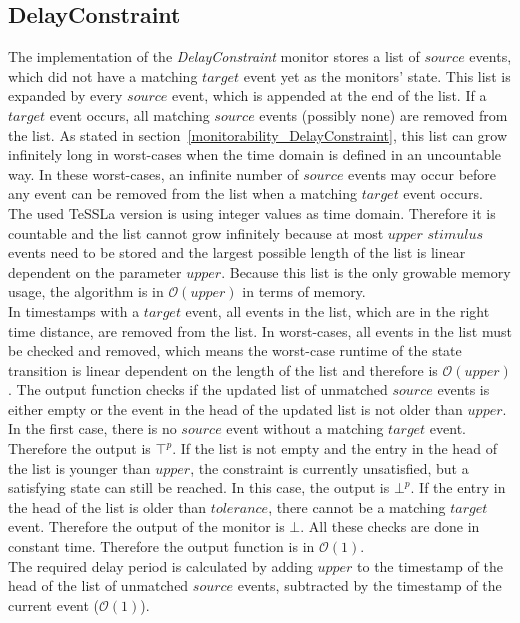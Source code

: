 \subsection{DelayConstraint}
	The implementation of the \emph{DelayConstraint} monitor stores a list of $source$ events, which did not have a matching $target$ event yet as the monitors' state. This list is expanded by every $source$ event, which is appended at the end of the list. If a $target$ event occurs, all matching $source$ events (possibly none) are removed from the list. As stated in section~\ref{monitorability_DelayConstraint}, this list can grow infinitely long in worst-cases when the time domain is defined in an uncountable way. In these worst-cases, an infinite number of $source$ events may occur before any event can be removed from the list when a matching $target$ event occurs.\\
	The used TeSSLa version is using integer values as time domain. Therefore it is countable and the list cannot grow infinitely because at most $upper$ $stimulus$ events need to be stored and the largest possible length of the list is linear dependent on the parameter $upper$. Because this list is the only growable memory usage, the algorithm is in $\mathcal{O}(upper)$ in terms of memory.\\
	In timestamps with a $target$ event, all events in the list, which are in the right time distance, are removed from the list. In worst-cases, all events in the list must be checked and removed, which means the worst-case runtime of the state transition is linear dependent on the length of the list and therefore is $\mathcal{O}(upper)$. %
	The output function checks if the updated list of unmatched $source$ events is either empty or the event in the head of the updated list is not older than $upper$. In the first case, there is no $source$ event without a matching $target$ event. Therefore the output is $\top^p$. If the list is not empty and the entry in the head of the list is younger than $upper$, the constraint is currently unsatisfied, but a satisfying state can still be reached. In this case, the output is $\bot^p$. If the entry in the head of the list is older than $tolerance$, there cannot be a matching $target$ event. Therefore the output of the monitor is $\bot$. All these checks are done in constant time. Therefore the output function is in $\mathcal{O}(1)$.\\
	The required delay period is calculated by adding $upper$ to the timestamp of the head of the list of unmatched $source$ events, subtracted by the timestamp of the current event ($\mathcal{O}(1)$).
	
